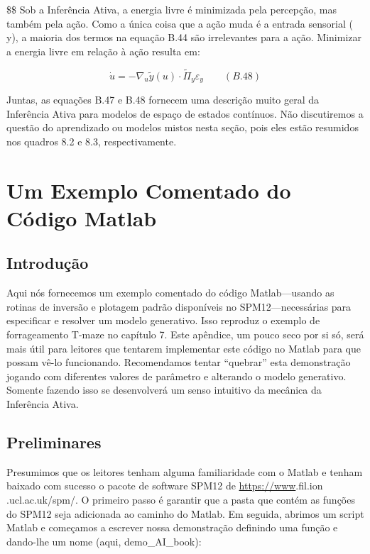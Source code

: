 \documentclass[
  12pt,
]{book}
\begin{document}
\$\$
Sob a Inferência Ativa, a energia livre é minimizada pela percepção, mas também pela ação. Como a única coisa que a ação muda é a entrada sensorial ( y), a maioria dos termos na equação B.44 são irrelevantes para a ação. Minimizar a energia livre em relação à ação resulta em:

\[ \dot u = - \nabla_u \tilde y(u) \cdot \tilde \Pi_y \varepsilon_y \qquad (B.48)\]

Juntas, as equações B.47 e B.48 fornecem uma descrição muito geral da Inferência Ativa para modelos de espaço de estados contínuos. Não discutiremos a questão do aprendizado ou modelos mistos nesta seção, pois eles estão resumidos nos quadros 8.2 e 8.3, respectivamente.

\hypertarget{um-exemplo-comentado-do-cuxf3digo-matlab}{%
\chapter{Um Exemplo Comentado do Código Matlab}\label{um-exemplo-comentado-do-cuxf3digo-matlab}}

\hypertarget{introduuxe7uxe3o-12}{%
\section{Introdução}\label{introduuxe7uxe3o-12}}

Aqui nós fornecemos um exemplo comentado do código Matlab---usando as rotinas de inversão e plotagem padrão disponíveis no SPM12---necessárias para especificar e resolver um modelo generativo. Isso reproduz o exemplo de forrageamento T-maze no capítulo 7. Este apêndice, um pouco seco por si só, será mais útil para leitores que tentarem implementar este código no Matlab para que possam vê-lo funcionando. Recomendamos tentar ``quebrar'' esta demonstração jogando com diferentes valores de parâmetro e alterando o modelo generativo. Somente fazendo isso se desenvolverá um senso intuitivo da mecânica da Inferência Ativa.

\hypertarget{preliminares}{%
\section{Preliminares}\label{preliminares}}

Presumimos que os leitores tenham alguma familiaridade com o Matlab e tenham baixado com sucesso o pacote de software SPM12 de \url{https://www}\hspace{0pt}.fil\hspace{0pt}.ion\hspace{0pt} .ucl\hspace{0pt}.ac\hspace{0pt}.uk\hspace{0pt}/spm\hspace{0pt}/. O primeiro passo é garantir que a pasta que contém as funções do SPM12 seja adicionada ao caminho do Matlab. Em seguida, abrimos um script Matlab e começamos a escrever nossa demonstração definindo uma função e dando-lhe um nome
(aqui, demo\_AI\_book):
\end{document}
